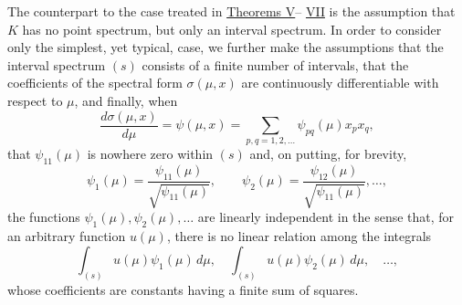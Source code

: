 \documentclass[b5paper,twoside]{article}
\newcommand{\originalpage}[1]{\phantomsection\label{origpage:#1}}
\begin{document}
The counterpart to the case treated in \hyperref[thm:V]{Theorems V}--
\hyperref[thm:VII]{VII} is the assumption that $K$ has no point spectrum,
but only an interval spectrum. In order to consider only the simplest, yet
typical, case, we further make the assumptions
\originalpage{206}
that the interval spectrum $(s)$ consists of a finite number of intervals,
that the coefficients of the spectral form $\sigma(\mu,x)$ are continuously
differentiable with respect to $\mu$, and finally, when
\[
  \frac{d\sigma(\mu,x)}{d\mu}=\psi(\mu,x)
  =\sum_{p,q=1,2,\ldots}\psi_{pq}(\mu)x_px_q,
\]
that $\psi_{11}(\mu)$ is nowhere zero within $(s)$ and, on putting, for
brevity,
\[
  \psi_1(\mu)=\frac{\psi_{11}(\mu)}{\sqrt{\psi_{11}(\mu)}},
  \qquad
  \psi_2(\mu)=\frac{\psi_{12}(\mu)}{\sqrt{\psi_{11}(\mu)}},\ldots,
\]
the functions $\psi_1(\mu),\psi_2(\mu),\ldots$ are linearly independent in
the sense that, for an arbitrary function $u(\mu)$, there is no linear
relation among the integrals
\begin{equation}
  \int_{(s)}u(\mu)\psi_1(\mu)\,d\mu,\quad
  \int_{(s)}u(\mu)\psi_2(\mu)\,d\mu,\quad\ldots,
  \tag{84}\label{eq:84}
\end{equation}
whose coefficients are constants having a finite sum of squares.
\end{document}
